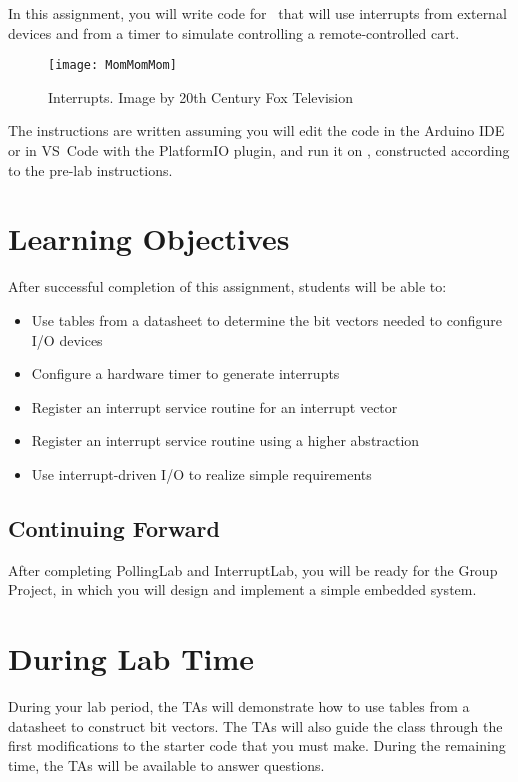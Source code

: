 In this assignment, you will write code for \runtimeenvironment\ that will use interrupts from external devices and from a timer to simulate controlling a remote-controlled cart.

\begin{figure}[h]
    \centering
    \texttt{[image: MomMomMom]}
    \caption{Interrupts. \tiny Image by 20th Century Fox Television}
\end{figure}

The instructions are written assuming you will edit the code in the Arduino IDE or in VS~Code with the PlatformIO plugin, and run it on \runtimeenvironment, constructed according to the pre-lab instructions.

\tableofcontents

\section*{Learning Objectives}

After successful completion of this assignment, students will be able to:
\begin{itemize}
    \item Use tables from a datasheet to determine the bit vectors needed to configure I/O devices
    \item Configure a hardware timer to generate interrupts
    \item Register an interrupt service routine for an interrupt vector
    \item Register an interrupt service routine using a higher abstraction
    \item Use interrupt-driven I/O to realize simple requirements
\end{itemize}

\subsection*{Continuing Forward}

After completing PollingLab and InterruptLab, you will be ready for the Group Project, in which you will design and implement a simple embedded system.

\section*{During Lab Time}

During your lab period, the TAs will demonstrate how to use tables from a datasheet to construct bit vectors.
The TAs will also guide the class through the first modifications to the starter code that you must make.
During the remaining time, the TAs will be available to answer questions.